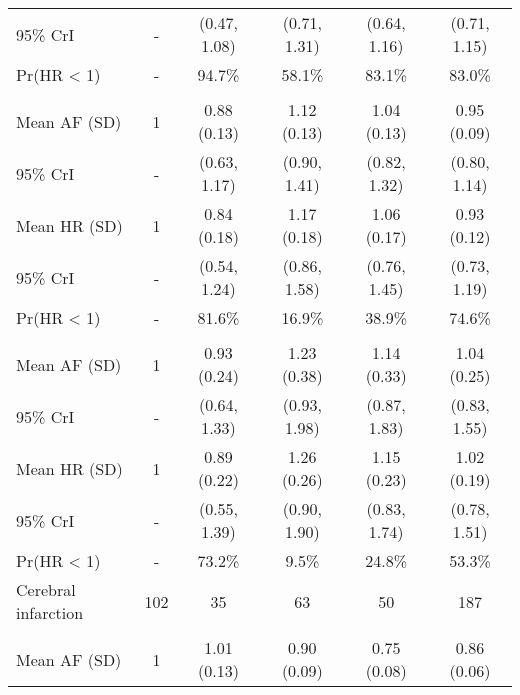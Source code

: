\documentclass[nutrients,article,submitted,moreauthors,pdftex]{Definitions/mdpi}
\begin{document}
\begin{table}[H]
{\begin{tabular}[t]{lccccc}
\rowcolor{gray!6}  \hspace{1em}95\% CrI & - & (0.47, 1.08) & (0.71, 1.31) & (0.64, 1.16) & (0.71, 1.15)\\
\hspace{1em}Pr(HR < 1) & - & 94.7\% & 58.1\% & 83.1\% & 83.0\%\\
\addlinespace[0.3em]
\multicolumn{6}{l}{\textbf{Model 1}}\\
\rowcolor{gray!6}  \hspace{1em}Mean AF (SD) & 1 & 0.88 (0.13) & 1.12 (0.13) & 1.04 (0.13) & 0.95 (0.09)\\
\hspace{1em}95\% CrI & - & (0.63, 1.17) & (0.90, 1.41) & (0.82, 1.32) & (0.80, 1.14)\\
\rowcolor{gray!6}  \hspace{1em}Mean HR (SD) & 1 & 0.84 (0.18) & 1.17 (0.18) & 1.06 (0.17) & 0.93 (0.12)\\
\hspace{1em}95\% CrI & - & (0.54, 1.24) & (0.86, 1.58) & (0.76, 1.45) & (0.73, 1.19)\\
\rowcolor{gray!6}  \hspace{1em}Pr(HR < 1) & - & 81.6\% & 16.9\% & 38.9\% & 74.6\%\\
\addlinespace[0.3em]
\multicolumn{6}{l}{\textbf{Model 2}}\\
\hspace{1em}Mean AF (SD) & 1 & 0.93 (0.24) & 1.23 (0.38) & 1.14 (0.33) & 1.04 (0.25)\\
\rowcolor{gray!6}  \hspace{1em}95\% CrI & - & (0.64, 1.33) & (0.93, 1.98) & (0.87, 1.83) & (0.83, 1.55)\\
\hspace{1em}Mean HR (SD) & 1 & 0.89 (0.22) & 1.26 (0.26) & 1.15 (0.23) & 1.02 (0.19)\\
\rowcolor{gray!6}  \hspace{1em}95\% CrI & - & (0.55, 1.39) & (0.90, 1.90) & (0.83, 1.74) & (0.78, 1.51)\\
\hspace{1em}Pr(HR < 1) & - & 73.2\% & 9.5\% & 24.8\% & 53.3\%\\
\hline
\rowcolor{gray!6}  Cerebral infarction & 102 & 35 & 63 & 50 & 187\\
\addlinespace[0.3em]
\multicolumn{6}{l}{\textbf{Model 0}}\\
\hspace{1em}Mean AF (SD) & 1 & 1.01 (0.13) & 0.90 (0.09) & 0.75 (0.08) & 0.86 (0.06)\\

\end{tabular}}
\end{table}
\end{document}
